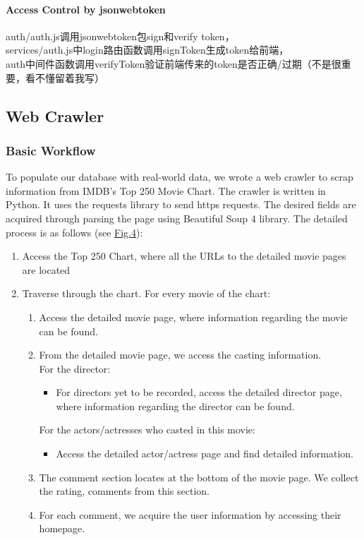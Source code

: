 \begin{CJK*}{UTF8}{gbsn}
\paragraph{Access Control by jsonwebtoken}
auth/auth.js调用jsonwebtoken包sign和verify token，\\
services/auth.js中login路由函数调用signToken生成token给前端，\\
auth中间件函数调用verifyToken验证前端传来的token是否正确/过期（不是很重要，看不懂留着我写）

\subsection{Web Crawler}
\subsubsection{Basic Workflow}
To populate our database with real-world data, we wrote a web crawler to scrap information from IMDB's Top 250 Movie Chart. The crawler is written in Python. It uses the requests library to send https requests. The desired fields are acquired through parsing the page using Beautiful Soup 4 library.
The detailed process is as follows (see \hyperref[crawler]{Fig.4}):\par

\begin{enumerate}
    \item Access the Top 250 Chart, where all the URLs to the detailed movie pages are located
    \item Traverse through the chart. For every movie of the chart:
    \begin{enumerate}
        \item Access the detailed movie page, where information regarding the movie can be found.
        \item From the detailed movie page, we access the casting information.\\ For the director:
        \begin{itemize}
            \item For directors yet to be recorded, access the detailed director page, where information regarding the director can be found.
        \end{itemize}
        For the actors/actresses who casted in this movie:
        \begin{itemize}
            \item Access the detailed actor/actress page and find detailed information.
        \end{itemize}
        \item The comment section locates at the bottom of the movie page. We collect the rating, comments from this section.
        \item For each comment, we acquire the user information by accessing their homepage.
    \end{enumerate}
\end{enumerate}


\end{CJK*}
